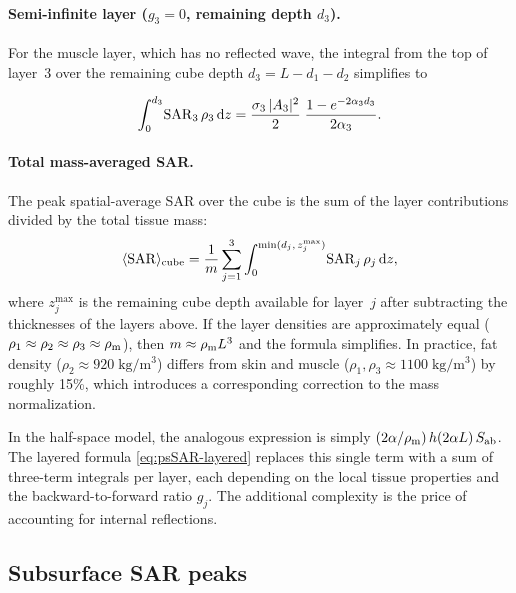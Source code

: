 \paragraph{Semi-infinite layer ($g_3 = 0$, remaining depth $d_3$).}
For the muscle layer, which has no reflected wave, the integral from the
top of layer~3 over the remaining cube depth
$d_3 = L - d_1 - d_2$ simplifies to

\begin{equation}\label{eq:muscle-integral}
  \int_0^{d_3}\!\mathrm{SAR}_3\,\rho_3\,\mathrm{d}z
  = \frac{\sigma_3\,|A_3|^2}{2}\;\frac{1 - e^{-2\alpha_3 d_3}}{2\alpha_3}.
\end{equation}

\paragraph{Total mass-averaged SAR.}
The peak spatial-average SAR over the cube is the sum of the layer
contributions divided by the total tissue mass:
\begin{equation}\label{eq:psSAR-layered}
  \langle\mathrm{SAR}\rangle_{\mathrm{cube}}
  = \frac{1}{m}\sum_{j=1}^{3}
    \int_0^{\min(d_j,\,z_j^{\max})}\!\mathrm{SAR}_j\,\rho_j\,\mathrm{d}z,
\end{equation}
where $z_j^{\max}$ is the remaining cube depth available for layer~$j$
after subtracting the thicknesses of the layers above.  If the layer
densities are approximately equal ($\rho_1 \approx \rho_2 \approx \rho_3
\approx \rho_{\mathrm{m}}$), then $m \approx \rho_{\mathrm{m}} L^3$ and the formula simplifies.
In practice, fat density ($\rho_2 \approx 920\;\mathrm{kg/m^3}$) differs
from skin and muscle ($\rho_1, \rho_3 \approx 1100\;\mathrm{kg/m^3}$) by
roughly 15\%, which introduces a corresponding correction to the mass
normalization.

\begin{remark}
In the half-space model, the analogous expression is simply
$(2\alpha/\rho_{\mathrm{m}})\,h(2\alpha L)\,S_{\mathrm{ab}}$.  The layered formula
\cref{eq:psSAR-layered} replaces this single term with a sum of
three-term integrals per layer, each depending on the local tissue
properties and the backward-to-forward ratio $g_j$.  The additional
complexity is the price of accounting for internal reflections.
\end{remark}


\subsection{Subsurface SAR peaks}
\label{sec:subsurface-peaks}

